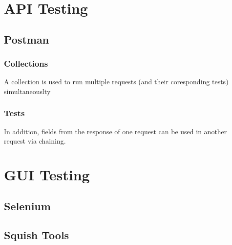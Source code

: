 \section{API Testing}
\subsection{Postman}
\subsubsection{Collections}
A collection is used to run multiple requests (and their coresponding tests) simultaneouslty
\subsubsection{Tests}
In addition, fields from the response of one request can be used in another request via chaining.

\section{GUI Testing}
\subsection{Selenium}
\subsection{Squish Tools}